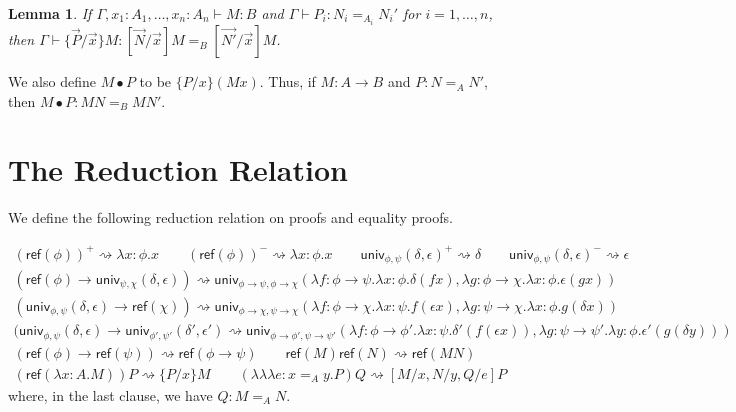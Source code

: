 \documentclass{easychair}
\newcommand{\univ}[4]{\mathsf{univ}_{{#1},{#2}} \left( {#3} , {#4} \right)}
\newcommand{\triplelambda}{\lambda \!\! \lambda \!\! \lambda}
\newcommand{\reff}[1]{\mathsf{ref} \left( {#1} \right)}
\newtheorem{lemma}{Lemma}
\begin{document}
\begin{lemma}
If $\Gamma, x_1 : A_1, \ldots, x_n : A_n \vdash M : B$ and $\Gamma \vdash P_i : N_i =_{A_i} N_i'$ for $i = 1, \ldots, n$, then
$\Gamma \vdash \{ \vec{P} / \vec{x} \} M : [ \vec{N} / \vec{x} ] M =_B [ \vec{N'} / \vec{x} ] M$.
\end{lemma}

We also define $M \bullet P$ to be $\{ P / x \} (Mx)$.  Thus, if $M : A \rightarrow B$ and $P : N =_A N'$, then $M \bullet P : MN =_B MN'$.

\section{The Reduction Relation}

We define the following reduction relation on proofs and equality proofs.

\begin{gather*}
(\reff{\phi})^+ \rightsquigarrow \lambda x : \phi . x
\qquad
(\reff{\phi})^- \rightsquigarrow \lambda x : \phi . x
\qquad
\univ{\phi}{\psi}{\delta}{\epsilon}^+ \rightsquigarrow \delta
\qquad
\univ{\phi}{\psi}{\delta}{\epsilon}^- \rightsquigarrow \epsilon
\\
(\reff \phi \rightarrow \univ{\psi}{\chi}{\delta}{\epsilon}) \rightsquigarrow \univ{\phi \rightarrow \psi}{\phi \rightarrow \chi}{\lambda f : \phi \rightarrow \psi . \lambda x : \phi . \delta (f x)}{\lambda g : \phi \rightarrow \chi . \lambda x : \phi . \epsilon (g x)}
\\
(\univ{\phi}{\psi}{\delta}{\epsilon} \rightarrow \reff{\chi}) \rightsquigarrow \univ{\phi \rightarrow \chi}{\psi \rightarrow \chi}{\lambda f : \phi \rightarrow \chi. \lambda x : \psi . f (\epsilon x)}{\lambda g : \psi \rightarrow \chi . \lambda x : \phi . g (\delta x)}
\\
(\univ{\phi}{\psi}{\delta}{\epsilon} \rightarrow \univ{\phi'}{\psi'}{\delta'}{\epsilon'} \rightsquigarrow \univ{\phi \rightarrow \phi'}{\psi \rightarrow \psi'}
{\lambda f : \phi \rightarrow \phi' . \lambda x : \psi . \delta' (f (\epsilon x))}{\lambda g : \psi \rightarrow \psi' . \lambda y : \phi . \epsilon' (g (\delta y))}
\\
(\reff{\phi} \rightarrow \reff{\psi}) \rightsquigarrow \reff{\phi \rightarrow \psi}
\qquad
\reff{M} \reff{N} \rightsquigarrow \reff{MN}
\\
(\reff{\lambda x:A.M})P \rightsquigarrow \{ P / x \} M
\qquad
(\triplelambda e : x =_A y.P)Q \rightsquigarrow [M/x, N/y, Q/e]P
\end{gather*}
where, in the last clause, we have $Q : M =_A N$.
\end{document}
